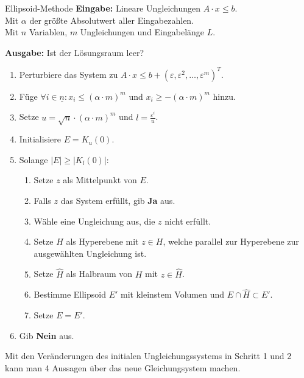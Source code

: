 \documentclass{panikzettel}
\begin{document}
\begin{algo}{Ellipsoid-Methode}
\textbf{Eingabe:} Lineare Ungleichungen $A \cdot x \leq b$.\\
Mit $\alpha$ der größte Absolutwert aller Eingabezahlen. \\
Mit $n$ Variablen, $m$ Ungleichungen und Eingabelänge $L$.

\textbf{Ausgabe:} Ist der Lösungsraum leer?
\tcblower

\begin{enumerate}
    \item Perturbiere das System zu $A \cdot x \leq b + (\varepsilon, \varepsilon^2, \dots ,\varepsilon^m)^T$.
    \item Füge $\forall i \in \underline{n} : x_i \leq (\alpha \cdot m)^m$ und $x_i\geq -(\alpha \cdot m)^m$ hinzu.
    \item Setze $u = \sqrt{n} \cdot (\alpha \cdot m)^m$ und $l = \frac{\varepsilon^i}{u}$.
    \item Initialisiere $E = K_u(0)$.
    \item Solange $|E| \geq |K_l(0)|$:
    \begin{enumerate}
        \item Setze $z$ als Mittelpunkt von $E$.
        \item Falls $z$ das System erfüllt, gib \textbf{Ja} aus.
        \item Wähle eine Ungleichung aus, die $z$ nicht erfüllt.
        \item Setze $H$ als Hyperebene mit $z \in H$, welche parallel zur Hyperebene zur ausgewählten Ungleichung ist.
        \item Setze $\hat{H}$ als Halbraum von $H$ mit $z \in \hat{H}$.
        \item Bestimme Ellipsoid $E'$ mit kleinstem Volumen und $E \cap \hat{H} \subset E'$.
        \item Setze $E = E'$.
    \end{enumerate}
    \item Gib \textbf{Nein} aus.
\end{enumerate}
\end{algo}

Mit den Veränderungen des initialen Ungleichungssystems in Schritt 1 und 2 kann man 4 Aussagen über das neue Gleichungsystem machen.
\end{document}
